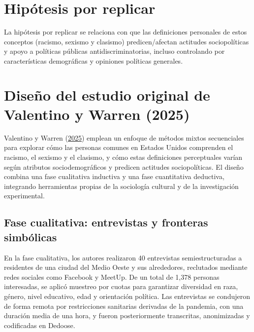 \documentclass[
  13pt,
  a4paper,
]{article}
\begin{document}
\hypertarget{hipuxf3tesis-por-replicar}{%
\section{Hipótesis por replicar}\label{hipuxf3tesis-por-replicar}}

La hipótesis por replicar se relaciona con que las definiciones personales de estos conceptos (racismo, sexismo y clasismo) predicen/afectan actitudes sociopolíticas y apoyo a políticas públicas antidiscriminatorias, incluso controlando por características demográficas y opiniones políticas generales.

\hypertarget{diseuxf1o-del-estudio-original-de-valentino-y-warren-2025}{%
\section{Diseño del estudio original de Valentino y Warren (2025)}\label{diseuxf1o-del-estudio-original-de-valentino-y-warren-2025}}

Valentino y Warren (\protect\hyperlink{ref-valentino_cultural_2025}{2025}) emplean un enfoque de métodos mixtos secuenciales para explorar cómo las personas comunes en Estados Unidos comprenden el racismo, el sexismo y el clasismo, y cómo estas definiciones perceptuales varían según atributos sociodemográficos y predicen actitudes sociopolíticas. El diseño combina una fase cualitativa inductiva y una fase cuantitativa deductiva, integrando herramientas propias de la sociología cultural y de la investigación experimental.

\hypertarget{fase-cualitativa-entrevistas-y-fronteras-simbuxf3licas}{%
\subsection{Fase cualitativa: entrevistas y fronteras simbólicas}\label{fase-cualitativa-entrevistas-y-fronteras-simbuxf3licas}}

En la fase cualitativa, los autores realizaron 40 entrevistas semiestructuradas a residentes de una ciudad del Medio Oeste y sus alrededores, reclutados mediante redes sociales como Facebook y MeetUp. De un total de 1,378 personas interesadas, se aplicó muestreo por cuotas para garantizar diversidad en raza, género, nivel educativo, edad y orientación política. Las entrevistas se condujeron de forma remota por restricciones sanitarias derivadas de la pandemia, con una duración media de una hora, y fueron posteriormente transcritas, anonimizadas y codificadas en Dedoose.
\end{document}

